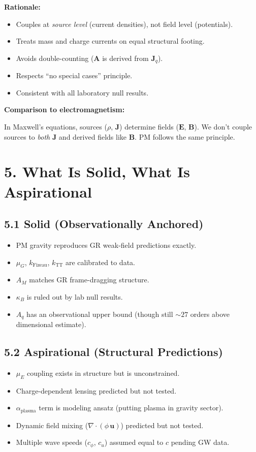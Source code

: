 \documentclass{article}
\begin{document}
\textbf{Rationale:}

\begin{itemize}
    \item Couples at \emph{source level} (current densities), not field level (potentials).
    \item Treats mass and charge currents on equal structural footing.
    \item Avoids double-counting ($\mathbf A$ is derived from $\mathbf J_q$).
    \item Respects ``no special cases'' principle.
    \item Consistent with all laboratory null results.
\end{itemize}

\textbf{Comparison to electromagnetism:}

In Maxwell's equations, sources ($\rho$, $\mathbf J$) determine fields
($\mathbf E$, $\mathbf B$). We don't couple sources to \emph{both} $\mathbf J$
and derived fields like $\mathbf B$. PM follows the same principle.

\section*{5. What Is Solid, What Is Aspirational}

\subsection*{5.1 Solid (Observationally Anchored)}

\begin{itemize}
    \item PM gravity reproduces GR weak-field predictions exactly.
    \item $\mu_G$, $k_{\text{Fizeau}}$, $k_{\text{TT}}$ are calibrated to data.
    \item $A_M$ matches GR frame-dragging structure.
    \item $\kappa_B$ is ruled out by lab null results.
    \item $A_q$ has an observational upper bound (though still $\sim 27$ orders above dimensional estimate).
\end{itemize}

\subsection*{5.2 Aspirational (Structural Predictions)}

\begin{itemize}
    \item $\mu_E$ coupling exists in structure but is unconstrained.
    \item Charge-dependent lensing predicted but not tested.
    \item $\alpha_{\text{plasma}}$ term is modeling ansatz (putting plasma in gravity sector).
    \item Dynamic field mixing ($\nabla\cdot(\phi\,\mathbf u)$) predicted but not tested.
    \item Multiple wave speeds ($c_\phi$, $c_u$) assumed equal to $c$ pending GW data.
\end{itemize}
\end{document}
